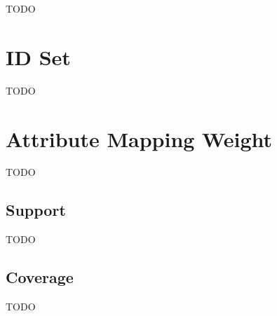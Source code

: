TODO

\section{ID Set}

TODO

\section{Attribute Mapping Weight}

TODO

\subsection{Support}

TODO

\subsection{Coverage}

TODO